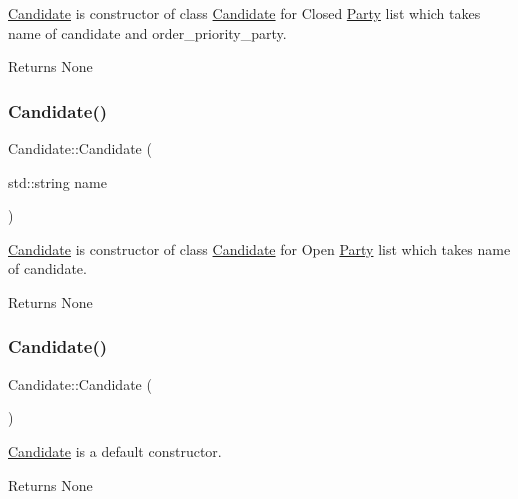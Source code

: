 \hyperlink{classCandidate}{Candidate} is constructor of class \hyperlink{classCandidate}{Candidate} for Closed \hyperlink{classParty}{Party} list which takes name of candidate and order\+\_\+priority\+\_\+party. 

\begin{DoxyReturn}{Returns}
None 
\end{DoxyReturn}
\mbox{\label{classCandidate_a99c1eda1eeecf4bbd054049449954c90}} 
\subsubsection{\texorpdfstring{Candidate()}{Candidate()}\hspace{0.1cm}{\footnotesize\ttfamily [2/3]}}
{\footnotesize\ttfamily Candidate\+::\+Candidate (\begin{DoxyParamCaption}\item[{std\+::string}]{name }\end{DoxyParamCaption})}



\hyperlink{classCandidate}{Candidate} is constructor of class \hyperlink{classCandidate}{Candidate} for Open \hyperlink{classParty}{Party} list which takes name of candidate. 

\begin{DoxyReturn}{Returns}
None 
\end{DoxyReturn}
\mbox{\label{classCandidate_aa2747741fb662af5e8f3d01d1d1a43b6}} 
\subsubsection{\texorpdfstring{Candidate()}{Candidate()}\hspace{0.1cm}{\footnotesize\ttfamily [3/3]}}
{\footnotesize\ttfamily Candidate\+::\+Candidate (\begin{DoxyParamCaption}{ }\end{DoxyParamCaption})}



\hyperlink{classCandidate}{Candidate} is a default constructor. 

\begin{DoxyReturn}{Returns}
None 
\end{DoxyReturn}


